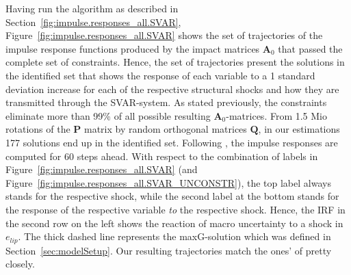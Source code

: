 \documentclass[a4paper,11pt,listof=nochaptergap,oneside,pointednumbers,bibtotoc,bigheadings,liststotoc,hidelinks]{scrbook}
\theoremstyle{mysatz}
\theoremstyle{mydefinition}
\theoremstyle{mytheorem}
\theoremstyle{mybemerkung}
\newcommand{\vect}[1]{\boldsymbol{\mathbf{#1}}}
\begin{document}
Having run the algorithm as described in Section~\ref{fig:impulse.responses_all.SVAR}, Figure~\ref{fig:impulse.responses_all.SVAR} shows the set of trajectories of the impulse response functions produced by the impact matrices $\vect{A}_0$ that passed the complete set of constraints. Hence, the set of trajectories present the solutions in the identified set that shows the response of each variable to a 1 standard deviation increase for each of the respective structural shocks and how they are transmitted through the SVAR-system. As stated previously, the constraints eliminate more than 99\% of all possible resulting $\vect{A}_0$-matrices. From 1.5 Mio rotations of the $\vect{P}$ matrix by random orthogonal matrices $\vect{Q}$, in our estimations 177 solutions end up in the identified set. Following \citet{ludvigsonetal:19}, the impulse responses are computed for 60 steps ahead. With respect to the combination of labels in Figure~\ref{fig:impulse.responses_all.SVAR} (and Figure~\ref{fig:impulse.responses_all.SVAR_UNCONSTR}), the top label always stands for the respective shock, while the second label at the bottom stands for the response of the respective variable \textit{to} the respective shock. Hence, the IRF in the second row on the left shows the reaction of macro uncertainty to a shock in $e_{lip}$. The thick dashed line represents the maxG-solution which was defined in Section~\ref{sec:modelSetup}. Our resulting trajectories match the ones' of \citet{ludvigsonetal:19} pretty closely. 
\end{document}
